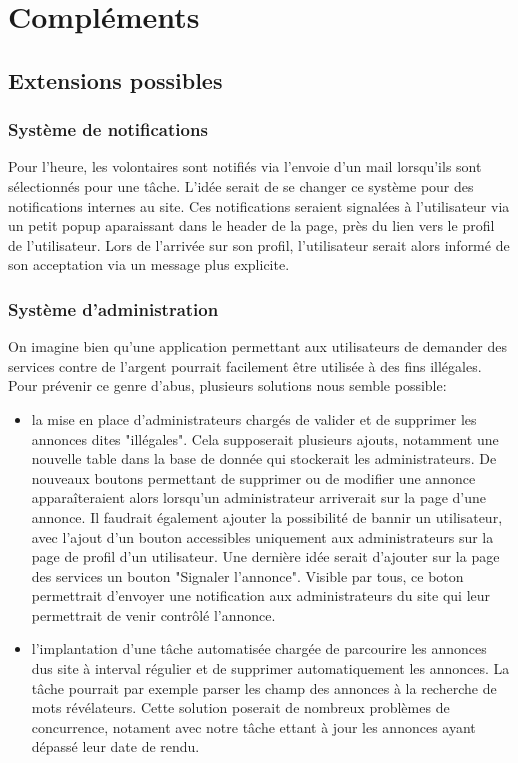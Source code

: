 \section{Compléments}

\subsection{Extensions possibles}

\subsubsection{Système de notifications}
Pour l'heure, les volontaires sont notifiés via l'envoie d'un mail lorsqu'ils sont sélectionnés pour une tâche. L'idée serait de se changer ce système pour des notifications internes au site. Ces notifications seraient signalées à l'utilisateur via un petit popup aparaissant dans le header de la page, près du lien vers le profil de l'utilisateur. Lors de l'arrivée sur son profil, l'utilisateur serait alors informé de son acceptation via un message plus explicite.

\subsubsection{Système d'administration}
On imagine bien qu'une application permettant aux utilisateurs de demander des services contre de l'argent pourrait facilement être utilisée à des fins illégales. Pour prévenir ce genre d'abus, plusieurs solutions nous semble possible:

\begin{itemize}
\item la mise en place d'administrateurs chargés de valider et de supprimer les annonces dites "illégales". Cela supposerait plusieurs ajouts, notamment une nouvelle table dans la base de donnée qui stockerait les administrateurs. De nouveaux boutons permettant de supprimer ou de modifier une annonce apparaîteraient alors lorsqu'un administrateur arriverait sur la page d'une annonce. Il faudrait également ajouter la possibilité de bannir un utilisateur, avec l'ajout d'un bouton accessibles uniquement aux administrateurs sur la page de profil d'un utilisateur. Une dernière idée serait d'ajouter sur la page des services un bouton "Signaler l'annonce". Visible par tous, ce boton permettrait d'envoyer une notification aux  administrateurs du site qui leur permettrait de venir contrôlé l'annonce.
\item l'implantation d'une tâche automatisée chargée de parcourire les annonces dus site à interval régulier et de supprimer automatiquement les annonces. La tâche pourrait par exemple parser les champ des annonces à la recherche de mots révélateurs. Cette solution poserait de nombreux problèmes de concurrence, notament avec notre tâche ettant à jour les annonces ayant dépassé leur date de rendu.
\end{itemize}

